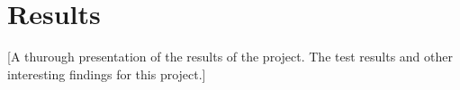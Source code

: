 \section{Results}\label{results}
    [A thurough presentation of the results of the project. The test results and other interesting findings for this project.]
